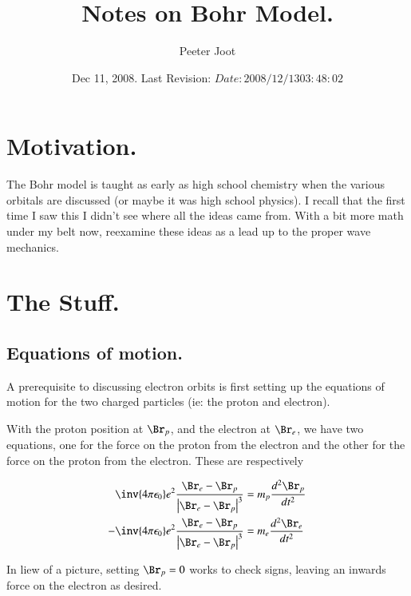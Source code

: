 \documentclass{article}
\title{ Notes on Bohr Model. }
\author{Peeter Joot}
\date{ Dec 11, 2008.  Last Revision: $Date: 2008/12/13 03:48:02 $ }
\newcommand{\K}[0]{\inv{4 \pi \epsilon_0}}
\begin{document}
\maketitle{}

\section{ Motivation. }

The Bohr model is taught as early as high school chemistry when the various orbitals are
discussed (or maybe it was high school physics).  I recall
that the first time I saw this I didn't see where all the ideas came from.
With a bit more math under my belt now, reexamine these ideas as a lead up to
the proper wave mechanics.

\section{ The Stuff. }

\subsection{ Equations of motion. }

A prerequisite to discussing electron orbits is first setting up the equations of motion
for the two charged particles (ie: the proton and electron).

With the proton position at $\Br_p$, and the electron at $\Br_e$, we have two equations, one
for the force on the proton from the electron and the other for the force on the proton from
the electron.  These are respectively

\begin{align}\label{eqn:chargeEquations}
  \K e^2 \frac { \Br_e - \Br_p } { \Abs{\Br_e - \Br_p}^3 } &= m_p \frac{d^2 \Br_p }{dt^2} \\
- \K e^2 \frac { \Br_e - \Br_p } { \Abs{\Br_e - \Br_p}^3 } &= m_e \frac{d^2 \Br_e }{dt^2}
\end{align}

In liew of a picture, setting $\Br_p = 0$ works to check signs, leaving an inwards force on the electron as desired.

%
\end{document}
